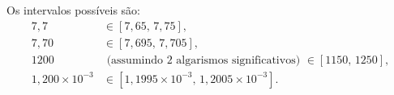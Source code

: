 Os intervalos possíveis são:
\begin{align*}
7{,}7 &\in [7{,}65,\,7{,}75],\\
7{,}70 &\in [7{,}695,\,7{,}705],\\
1200 &\text{ (assumindo 2 algarismos significativos) }\in [1150,\,1250],\\
1{,}200\times10^{-3} &\in [1{,}1995\times10^{-3},\,1{,}2005\times10^{-3}].
\end{align*}